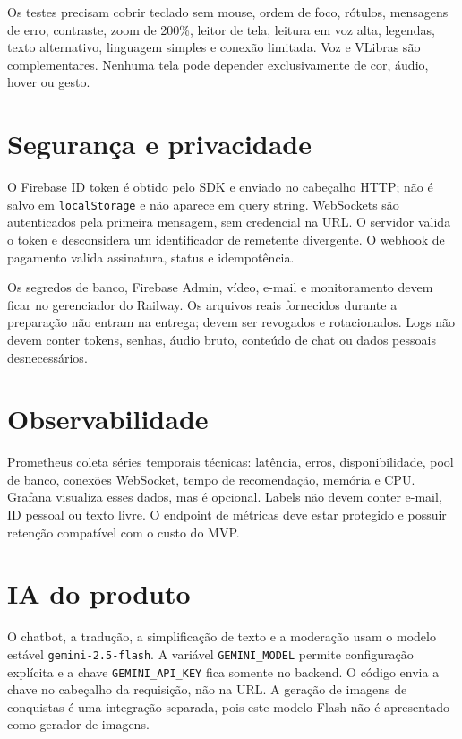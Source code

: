 Os testes precisam cobrir teclado sem mouse, ordem de foco, rótulos, mensagens de erro, contraste, zoom de 200\%, leitor de tela, leitura em voz alta, legendas, texto alternativo, linguagem simples e conexão limitada. Voz e VLibras são complementares. Nenhuma tela pode depender exclusivamente de cor, áudio, hover ou gesto.

\section{Segurança e privacidade}

O Firebase ID token é obtido pelo SDK e enviado no cabeçalho HTTP; não é salvo em \texttt{localStorage} e não aparece em query string. WebSockets são autenticados pela primeira mensagem, sem credencial na URL. O servidor valida o token e desconsidera um identificador de remetente divergente. O webhook de pagamento valida assinatura, status e idempotência.

Os segredos de banco, Firebase Admin, vídeo, e-mail e monitoramento devem ficar no gerenciador do Railway. Os arquivos reais fornecidos durante a preparação não entram na entrega; devem ser revogados e rotacionados. Logs não devem conter tokens, senhas, áudio bruto, conteúdo de chat ou dados pessoais desnecessários.

\section{Observabilidade}

Prometheus coleta séries temporais técnicas: latência, erros, disponibilidade, pool de banco, conexões WebSocket, tempo de recomendação, memória e CPU. Grafana visualiza esses dados, mas é opcional. Labels não devem conter e-mail, ID pessoal ou texto livre. O endpoint de métricas deve estar protegido e possuir retenção compatível com o custo do MVP.

\section{IA do produto}

O chatbot, a tradução, a simplificação de texto e a moderação usam o modelo estável \texttt{gemini-2.5-flash}. A variável \texttt{GEMINI\_MODEL} permite configuração explícita e a chave \texttt{GEMINI\_API\_KEY} fica somente no backend. O código envia a chave no cabeçalho da requisição, não na URL. A geração de imagens de conquistas é uma integração separada, pois este modelo Flash não é apresentado como gerador de imagens.

